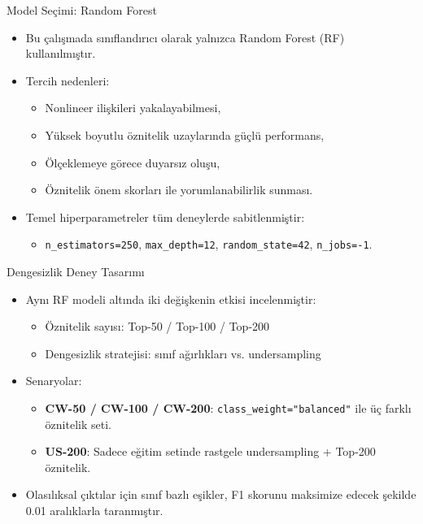 \documentclass[aspectratio=169]{beamer}
\begin{document}
\begin{frame}{Model Seçimi: Random Forest}
	\begin{itemize}
		\item Bu çalışmada sınıflandırıcı olarak yalnızca Random Forest (RF) kullanılmıştır.
		\item Tercih nedenleri:
		\begin{itemize}
			\item Nonlineer ilişkileri yakalayabilmesi,
			\item Yüksek boyutlu öznitelik uzaylarında güçlü performans,
			\item Ölçeklemeye görece duyarsız oluşu,
			\item Öznitelik önem skorları ile yorumlanabilirlik sunması.
		\end{itemize}
		\item Temel hiperparametreler tüm deneylerde sabitlenmiştir:
		\begin{itemize}
			\item \texttt{n\_estimators=250}, \texttt{max\_depth=12}, \texttt{random\_state=42}, \texttt{n\_jobs=-1}.
		\end{itemize}
	\end{itemize}
\end{frame}

\begin{frame}{Dengesizlik Deney Tasarımı}
	\begin{itemize}
		\item Aynı RF modeli altında iki değişkenin etkisi incelenmiştir:
		\begin{itemize}
			\item Öznitelik sayısı: Top-50 / Top-100 / Top-200
			\item Dengesizlik stratejisi: sınıf ağırlıkları vs. undersampling
		\end{itemize}
		\item Senaryolar:
		\begin{itemize}
			\item \textbf{CW-50 / CW-100 / CW-200}: \texttt{class\_weight="balanced"} ile üç farklı öznitelik seti.
			\item \textbf{US-200}: Sadece eğitim setinde rastgele undersampling + Top-200 öznitelik.
		\end{itemize}
		\item Olasılıksal çıktılar için sınıf bazlı eşikler, F1 skorunu maksimize edecek şekilde 0.01 aralıklarla taranmıştır.
	\end{itemize}
\end{frame}
\end{document}
